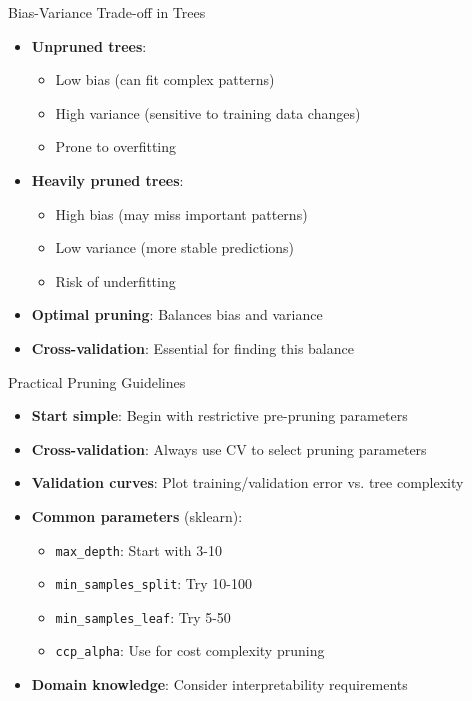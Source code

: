 \documentclass[usenames,dvipsnames]{beamer}
\begin{document}
\begin{frame}{Bias-Variance Trade-off in Trees}
\begin{itemize}[<+->]
\item \textbf{Unpruned trees}:
    \begin{itemize}
    \item Low bias (can fit complex patterns)
    \item High variance (sensitive to training data changes)
    \item Prone to overfitting
    \end{itemize}
\item \textbf{Heavily pruned trees}:
    \begin{itemize}
    \item High bias (may miss important patterns)
    \item Low variance (more stable predictions)
    \item Risk of underfitting
    \end{itemize}
\item \textbf{Optimal pruning}: Balances bias and variance
\item \textbf{Cross-validation}: Essential for finding this balance
\end{itemize}
\end{frame}

\begin{frame}{Practical Pruning Guidelines}
\begin{itemize}[<+->]
\item \textbf{Start simple}: Begin with restrictive pre-pruning parameters
\item \textbf{Cross-validation}: Always use CV to select pruning parameters
\item \textbf{Validation curves}: Plot training/validation error vs. tree complexity
\item \textbf{Common parameters} (sklearn):
    \begin{itemize}
    \item \texttt{max\_depth}: Start with 3-10
    \item \texttt{min\_samples\_split}: Try 10-100
    \item \texttt{min\_samples\_leaf}: Try 5-50
    \item \texttt{ccp\_alpha}: Use for cost complexity pruning
    \end{itemize}
\item \textbf{Domain knowledge}: Consider interpretability requirements
\end{itemize}
\end{frame}
\end{document}
